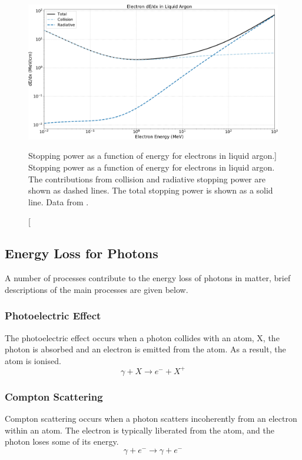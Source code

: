 \begin{figure}

	\centering

	\includegraphics[width=\textwidth]{figures/electron_dedx_argon.pdf}

	\caption
	[Stopping power as a function of energy for electrons in liquid argon.]
	{Stopping power as a function of energy for electrons in liquid argon. The
	contributions from collision and radiative stopping power are shown as dashed
	lines. The total stopping power is shown as a solid line. Data from 
	\cite{estar}.}

	\label{fig:electron_dedx}

\end{figure}

\subsection{Energy Loss for Photons}
A number of processes contribute to the energy loss of photons in matter, brief 
descriptions of the main processes are given below.

\subsubsection*{Photoelectric Effect}
The photoelectric effect occurs when a photon collides with an atom, X, the
photon is absorbed and an electron is emitted from the atom. As a result, the 
atom is ionised. 
\begin{equation*}
	\gamma + X \rightarrow e^- + X^+
\end{equation*}

\subsubsection*{Compton Scattering}
Compton scattering occurs when a photon scatters incoherently from an electron
within an atom. The electron is typically liberated from the atom, and the
photon loses some of its energy.
\begin{equation*}
	\gamma + e^- \rightarrow \gamma + e^-
\end{equation*}

